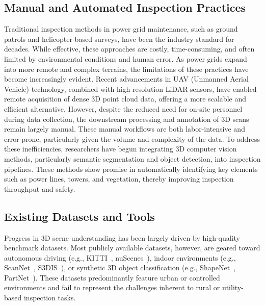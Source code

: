 \subsection{Manual and Automated Inspection Practices}
%
Traditional inspection methods in power grid maintenance, such as ground
patrols and helicopter-based surveys, have been the industry standard for
decades. While effective, these approaches are costly, time-consuming, and
often limited by environmental conditions and human error. As power grids
expand into more remote and complex terrains, the limitations of these
practices have become increasingly evident.
%
Recent advancements in UAV (Unmanned Aerial Vehicle) technology, combined with
high-resolution LiDAR sensors, have enabled remote acquisition of dense 3D
point cloud data, offering a more scalable and efficient alternative. However,
despite the reduced need for on-site personnel during data collection, the
downstream processing and annotation of 3D scans remain largely manual. These
manual workflows are both labor-intensive and error-prone, particularly given
the volume and complexity of the data. To address these inefficiencies,
researchers have begun integrating 3D computer vision methods, particularly
semantic segmentation and object detection, into inspection pipelines. These
methods show promise in automatically identifying key elements such as power
lines, towers, and vegetation, thereby improving inspection throughput and
safety.

\subsection{Existing Datasets and Tools}

Progress in 3D scene understanding has been largely driven by high-quality
benchmark datasets. Most publicly available datasets, however, are geared
toward autonomous driving (e.g., KITTI~\cite{behley2019semantickitti},
nuScenes~\cite{caesar2020nuscenes}), indoor environments (e.g.,
ScanNet~\cite{dai2017scannet}, S3DIS~\cite{armeni20163d}), or synthetic 3D
object classification (e.g., ShapeNet~\cite{chang2015shapenet},
PartNet~\cite{mo2019partnet}). These datasets predominantly feature urban or
controlled environments and fail to represent the challenges inherent to rural
or utility-based inspection tasks.

